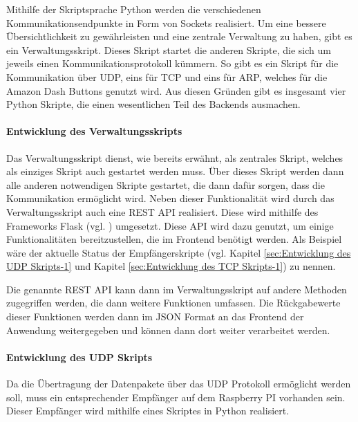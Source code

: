 Mithilfe der Skriptsprache Python werden die verschiedenen Kommunikationsendpunkte in Form von Sockets realisiert. Um eine bessere Übersichtlichkeit zu gewährleisten und eine zentrale Verwaltung zu haben, gibt es ein Verwaltungsskript. Dieses Skript startet die anderen Skripte, die sich um jeweils einen Kommunikationsprotokoll kümmern. So gibt es ein Skript für die Kommunikation über \ac{UDP}, eins für \ac{TCP} und eins für \ac{ARP}, welches für die Amazon Dash Buttons genutzt wird. Aus diesen Gründen gibt es insgesamt vier Python Skripte, die einen wesentlichen Teil des Backends ausmachen.

\paragraph{Entwicklung des Verwaltungsskripts}$\;$ \\  
\label{sec:Entwicklung des Verwaltungsskripts-1} 
Das Verwaltungsskript dienst, wie bereits erwähnt, als zentrales Skript, welches als einziges Skript auch gestartet werden muss. Über dieses Skript werden dann alle anderen notwendigen Skripte gestartet, die dann dafür sorgen, dass die Kommunikation ermöglicht wird.
Neben dieser Funktionalität wird durch das Verwaltungsskript auch eine \ac{REST} \ac{API} realisiert. Diese wird mithilfe des Frameworks Flask (vgl. \cite{.s}) umgesetzt. Diese \ac{API} wird dazu genutzt, um einige Funktionalitäten bereitzustellen, die im Frontend benötigt werden. Als Beispiel wäre der aktuelle Status der Empfängerskripte (vgl. Kapitel \ref{sec:Entwicklung des UDP Skripts-1} und Kapitel \ref{sec:Entwicklung des TCP Skripts-1}) zu nennen. 

Die genannte \ac{REST} \ac{API} kann dann im Verwaltungsskript auf andere Methoden zugegriffen werden, die dann weitere Funktionen umfassen. Die Rückgabewerte dieser Funktionen werden dann im \ac{JSON} Format an das Frontend der Anwendung weitergegeben und können dann dort weiter verarbeitet werden. 

\paragraph{Entwicklung des UDP Skripts}$\;$ \\  
\label{sec:Entwicklung des UDP Skripts-1} 
Da die Übertragung der Datenpakete über das \ac{UDP} Protokoll ermöglicht werden soll, muss ein entsprechender Empfänger auf dem Raspberry PI vorhanden sein. Dieser Empfänger wird mithilfe eines Skriptes in Python realisiert.

